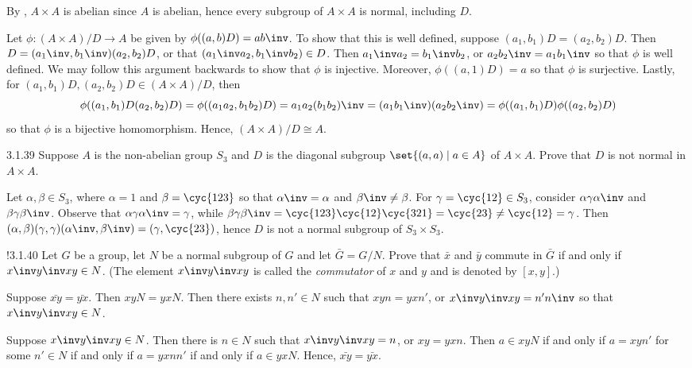 \begin{sol}
    By , $A \times A$ is abelian since $A$ is abelian, hence every subgroup of $A \times A$ is normal, including $D$.

    Let $\phi \colon (A \times A)/D \to A$ be given by $\phi((a, b)D) = ab\inv$.
	To show that this is well defined, suppose $(a_1, b_1)D = (a_2, b_2)D$.
	Then $D = (a_1\inv, b_1\inv)(a_2, b_2)D$, or that $(a_1\inv a_2, b_1\inv b_2) \in D$.
	Then $a_1\inv a_2 = b_1\inv b_2$, or $a_2b_2\inv = a_1b_1\inv$ so that $\phi$ is well defined.
	We may follow this argument backwards to show that $\phi$ is injective.
	Moreover, $\phi((a, 1)D) = a$ so that $\phi$ is surjective.
	Lastly, for $(a_1, b_1)D, (a_2, b_2)D \in (A \times A)/D$, then
    \[
    	\phi((a_1, b_1)D (a_2, b_2)D) = \phi((a_1a_2, b_1b_2)D) = a_1a_2(b_1b_2)\inv = (a_1b_1\inv)(a_2b_2\inv) = \phi((a_1, b_1)D)\phi((a_2, b_2)D)
    \]
    so that $\phi$ is a bijective homomorphism.
	Hence, $(A \times A)/D \cong A$.
\end{sol}

\begin{exercise}{3.1.39}
    Suppose $A$ is the non-abelian group $S_3$ and $D$ is the diagonal subgroup $\set{(a,a) \mid a \in A}$ of $A \times A$.
	Prove that $D$ is not normal in $A \times A$.
\end{exercise}

\begin{sol}
    Let $\alpha, \beta \in S_3$, where $\alpha = 1$ and $\beta = \cyc{1 2 3}$ so that $\alpha\inv = \alpha$ and $\beta\inv \neq \beta$.
	For $\gamma = \cyc{1 2} \in S_3$, consider $\alpha\gamma\alpha\inv$ and $\beta\gamma\beta\inv$.
	Observe that $\alpha\gamma\alpha\inv = \gamma$, while $\beta\gamma\beta\inv = \cyc{1 2 3}\cyc{1 2}\cyc{3 2 1} = \cyc{2 3} \neq \cyc{1 2} = \gamma$.
	Then $(\alpha, \beta)(\gamma, \gamma)(\alpha\inv, \beta\inv) = (\gamma, \cyc{2 3})$, hence $D$ is not a normal subgroup of $S_3 \times S_3$.
\end{sol}

\begin{exercise}!{3.1.40}
    Let $G$ be a group, let $N$ be a normal subgroup of $G$ and let $\bar{G} = G/N$.
	Prove that $\bar{x}$ and $\bar{y}$ commute in $\bar{G}$ if and only if $x\inv y\inv xy \in N$. (The element $x\inv y\inv xy$ is called the \emph{commutator} of $x$ and $y$ and is denoted by $[x,y]$.)
\end{exercise}

\begin{soliff}
    \rightimp Suppose $\bar{xy} = \bar{yx}$.
	Then $xyN = yxN$.
	Then there exists $n, n' \in N$ such that $xyn = yxn'$, or $x\inv y\inv xy = n'n\inv$ so that $x\inv y\inv xy \in N$.

    \leftimp Suppose $x\inv y\inv xy\in N$.
	Then there is $n \in N$ such that $x\inv y\inv xy = n$, or $xy = yxn$.
	Then $a \in xyN$ if and only if $a = xyn'$ for some $n' \in N$ if and only if $a = yxnn'$ if and only if $a \in yxN$.
	Hence, $\bar{xy} = \bar{yx}$.
\end{soliff}

